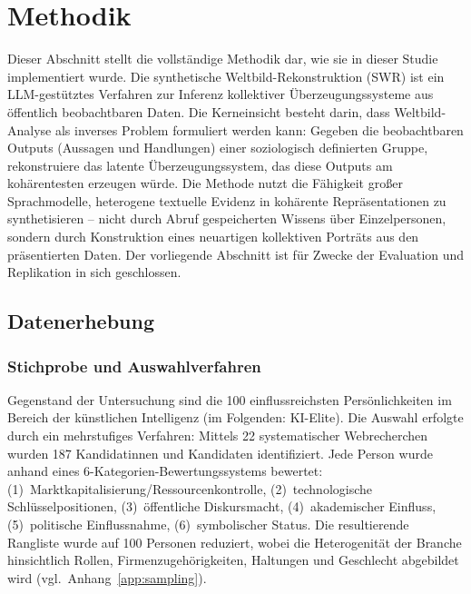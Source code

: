 \documentclass[12pt,a4paper]{article}
\begin{document}
\section{Methodik}
\label{sec:methodik}

Dieser Abschnitt stellt die vollständige Methodik dar, wie sie in dieser Studie implementiert wurde. Die synthetische Weltbild-Rekonstruktion (SWR) ist ein LLM-gestütztes Verfahren zur Inferenz kollektiver Überzeugungssysteme aus öffentlich beobachtbaren Daten. Die Kerneinsicht besteht darin, dass Weltbild-Analyse als inverses Problem formuliert werden kann: Gegeben die beobachtbaren Outputs (Aussagen und Handlungen) einer soziologisch definierten Gruppe, rekonstruiere das latente Überzeugungssystem, das diese Outputs am kohärentesten erzeugen würde. Die Methode nutzt die Fähigkeit großer Sprachmodelle, heterogene textuelle Evidenz in kohärente Repräsentationen zu synthetisieren -- nicht durch Abruf gespeicherten Wissens über Einzelpersonen, sondern durch Konstruktion eines neuartigen kollektiven Porträts aus den präsentierten Daten. Der vorliegende Abschnitt ist für Zwecke der Evaluation und Replikation in sich geschlossen.


\subsection{Datenerhebung}
\label{sec:methodik:daten}

\subsubsection{Stichprobe und Auswahlverfahren}

Gegenstand der Untersuchung sind die 100 einflussreichsten Persönlichkeiten im Bereich der künstlichen Intelligenz (im Folgenden: KI-Elite). Die Auswahl erfolgte durch ein mehrstufiges Verfahren: Mittels 22 systematischer Webrecherchen wurden 187 Kandidatinnen und Kandidaten identifiziert. Jede Person wurde anhand eines 6-Kategorien-Bewertungssystems bewertet: (1)~Marktkapitalisierung/Ressourcenkontrolle, (2)~technologische Schlüsselpositionen, (3)~öffentliche Diskursmacht, (4)~akademischer Einfluss, (5)~politische Einflussnahme, (6)~symbolischer Status. Die resultierende Rangliste wurde auf 100 Personen reduziert, wobei die Heterogenität der Branche hinsichtlich Rollen, Firmenzugehörigkeiten, Haltungen und Geschlecht abgebildet wird (vgl.\ Anhang~\ref{app:sampling}).
\end{document}
